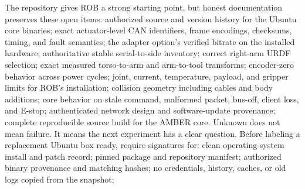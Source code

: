 {}
\markdownRendererSectionEnd \markdownRendererSectionBegin
{}\markdownRendererInterblockSeparator
{}The repository gives ROB a strong starting point, but honest documentation preserves these open items:\markdownRendererInterblockSeparator
{}\markdownRendererUlBegin
\markdownRendererUlItem authorized source and version history for the Ubuntu core binaries;\markdownRendererUlItemEnd 
\markdownRendererUlItem exact actuator-level CAN identifiers, frame encodings, checksums, timing, and fault semantics;\markdownRendererUlItemEnd 
\markdownRendererUlItem the adapter option's verified bitrate on the installed hardware;\markdownRendererUlItemEnd 
\markdownRendererUlItem authoritative stable serial-to-side inventory;\markdownRendererUlItemEnd 
\markdownRendererUlItem correct right-arm URDF selection;\markdownRendererUlItemEnd 
\markdownRendererUlItem exact measured torso-to-arm and arm-to-tool transforms;\markdownRendererUlItemEnd 
\markdownRendererUlItem encoder-zero behavior across power cycles;\markdownRendererUlItemEnd 
\markdownRendererUlItem joint, current, temperature, payload, and gripper limits for ROB's installation;\markdownRendererUlItemEnd 
\markdownRendererUlItem collision geometry including cables and body additions;\markdownRendererUlItemEnd 
\markdownRendererUlItem core behavior on stale command, malformed packet, bus-off, client loss, and E-stop;\markdownRendererUlItemEnd 
\markdownRendererUlItem authenticated network design and software-update provenance;\markdownRendererUlItemEnd 
\markdownRendererUlItem complete reproducible source build for the AMBER core.\markdownRendererUlItemEnd 
\markdownRendererUlEnd \markdownRendererInterblockSeparator
{}Unknown does not mean failure. It means the next experiment has a clear question.\markdownRendererInterblockSeparator
{}
\markdownRendererSectionEnd \markdownRendererSectionBegin
{}\markdownRendererInterblockSeparator
{}Before labeling a replacement Ubuntu box ready, require signatures for:\markdownRendererInterblockSeparator
{}\markdownRendererUlBegin
\markdownRendererUlItem \markdownRendererUntickedBox{} clean operating-system install and patch record;\markdownRendererUlItemEnd 
\markdownRendererUlItem \markdownRendererUntickedBox{} pinned package and repository manifest;\markdownRendererUlItemEnd 
\markdownRendererUlItem \markdownRendererUntickedBox{} authorized binary provenance and matching hashes;\markdownRendererUlItemEnd 
\markdownRendererUlItem \markdownRendererUntickedBox{} no credentials, history, caches, or old logs copied from the snapshot;\markdownRendererUlItemEnd 
